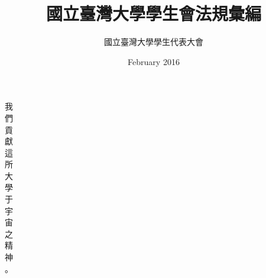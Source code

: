 \documentclass[9pt,a4paper]{article}
\title{\huge 國立臺灣大學學生會法規彙編} %
\author{國立臺灣大學學生代表大會} %
\date{February 2016} %
\begin{document}
\clearpage

\maketitle %

\newpage

\newpage

\vspace*{\fill}
\begin{center}
\huge 我\\們\\貢\\獻\\這\\所\\大\\學\\于\\宇\\宙\\之\\精\\神\\。
\end{center}
\vspace*{\fill}

\newpage
\tableofcontents{}
\end{document}
